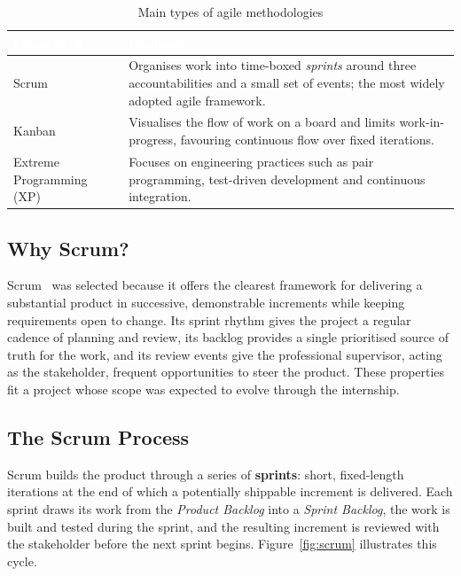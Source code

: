 \begin{table}[H]
  \centering
  \caption{Main types of agile methodologies}
  \label{tab:agile}
  \begin{tabularx}{\textwidth}{|l|X|}
    \hline
    \rowcolor{tableHeader}
    \textcolor{white}{\textbf{Framework}} & \textcolor{white}{\textbf{Emphasis}} \\
    \hline
    Scrum & Organises work into time-boxed \emph{sprints} around three accountabilities and a small set of events; the most widely adopted agile framework. \\ \hline
    Kanban & Visualises the flow of work on a board and limits work-in-progress, favouring continuous flow over fixed iterations. \\ \hline
    Extreme Programming (XP) & Focuses on engineering practices such as pair programming, test-driven development and continuous integration. \\ \hline
  \end{tabularx}
\end{table}

\subsection{Why Scrum?}

Scrum~\cite{scrumguide} was selected because it offers the clearest
framework for delivering a substantial product in successive,
demonstrable increments while keeping requirements open to change. Its
sprint rhythm gives the project a regular cadence of planning and
review, its backlog provides a single prioritised source of truth for
the work, and its review events give the professional supervisor, 
acting as the stakeholder, frequent opportunities to steer the
product. These properties fit a project whose scope was expected to
evolve through the internship.

\subsection{The Scrum Process}

Scrum builds the product through a series of \textbf{sprints}: short,
fixed-length iterations at the end of which a potentially shippable
increment is delivered. Each sprint draws its work from the
\emph{Product Backlog} into a \emph{Sprint Backlog}, the work is built
and tested during the sprint, and the resulting increment is reviewed
with the stakeholder before the next sprint begins.
Figure~\ref{fig:scrum} illustrates this cycle.

